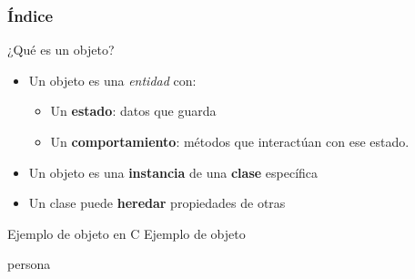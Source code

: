 \documentclass{mybeamer}
\institute{
	{\textsl{\large Tema 7}}
	\\[1em]
	\textbf{\Large Objetos}
}
\begin{document}
\begin{frame}
\titlepage
\end{frame}

\begin{frame}
\frametitle{Índice}
	\tableofcontents
\end{frame}

\begin{framesec}[Qué es?]{¿Qué es un objeto?}
	\begin{itemize}
		\item Un objeto es una \textit{entidad} con:
		\begin{itemize}
			\item Un \textbf{estado}: datos que guarda
			\item Un \textbf{comportamiento}: métodos que
				interactúan con ese estado.
		\end{itemize}
		\item Un objeto es una \textbf{instancia} de una \textbf{clase}
			específica
		\item Un clase puede \textbf{heredar} propiedades de otras
	\end{itemize}
\end{framesec}

\begin{framesec}[Ejemplo]{Ejemplo de objeto en C}
	\centering
	{\Huge Ejemplo de objeto}

	{\Large persona}
\end{framesec}
\end{document}
